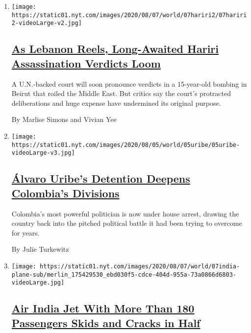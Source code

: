 \begin{enumerate}
\def\labelenumi{\arabic{enumi}.}
\item
  \texttt{[image: https://static01.nyt.com/images/2020/08/07/world/07hariri2/07hariri2-videoLarge-v2.jpg]}

  \hypertarget{as-lebanon-reels-long-awaited-hariri-assassination-verdicts-loom}{%
  \subsection{\texorpdfstring{\href{/2020/08/08/world/middleeast/hariri-assassination-trial-hague.html}{As
  Lebanon Reels, Long-Awaited Hariri Assassination Verdicts
  Loom}}{As Lebanon Reels, Long-Awaited Hariri Assassination Verdicts Loom}}\label{as-lebanon-reels-long-awaited-hariri-assassination-verdicts-loom}}

  A U.N.-backed court will soon pronounce verdicts in a 15-year-old
  bombing in Beirut that roiled the Middle East. But critics say the
  court's protracted deliberations and huge expense have undermined its
  original purpose.

  By Marlise Simons and Vivian Yee
\item
  \texttt{[image: https://static01.nyt.com/images/2020/08/05/world/05uribe/05uribe-videoLarge-v3.jpg]}

  \hypertarget{uxe1lvaro-uribes-detention-deepens-colombias-divisions}{%
  \subsection{\texorpdfstring{\href{/2020/08/07/world/americas/uribe-colombia-house-arrest.html}{Álvaro
  Uribe's Detention Deepens Colombia's
  Divisions}}{Álvaro Uribe's Detention Deepens Colombia's Divisions}}\label{uxe1lvaro-uribes-detention-deepens-colombias-divisions}}

  Colombia's most powerful politician is now under house arrest, drawing
  the country back into the pitched political battle it had been trying
  to overcome for years.

  By Julie Turkewitz
\item
  \texttt{[image: https://static01.nyt.com/images/2020/08/07/world/07india-plane-sub/merlin\_175429530\_ebd030f5-cdce-404d-955a-73a0866d6803-videoLarge.jpg]}

  \hypertarget{air-india-jet-with-more-than-180-passengers-skids-and-cracks-in-half}{%
  \subsection{\texorpdfstring{\href{/2020/08/07/world/asia/air-india-plane-crash.html}{Air
  India Jet With More Than 180 Passengers Skids and Cracks in
  Half}}{Air India Jet With More Than 180 Passengers Skids and Cracks in Half}}\label{air-india-jet-with-more-than-180-passengers-skids-and-cracks-in-half}}


\end{enumerate}
